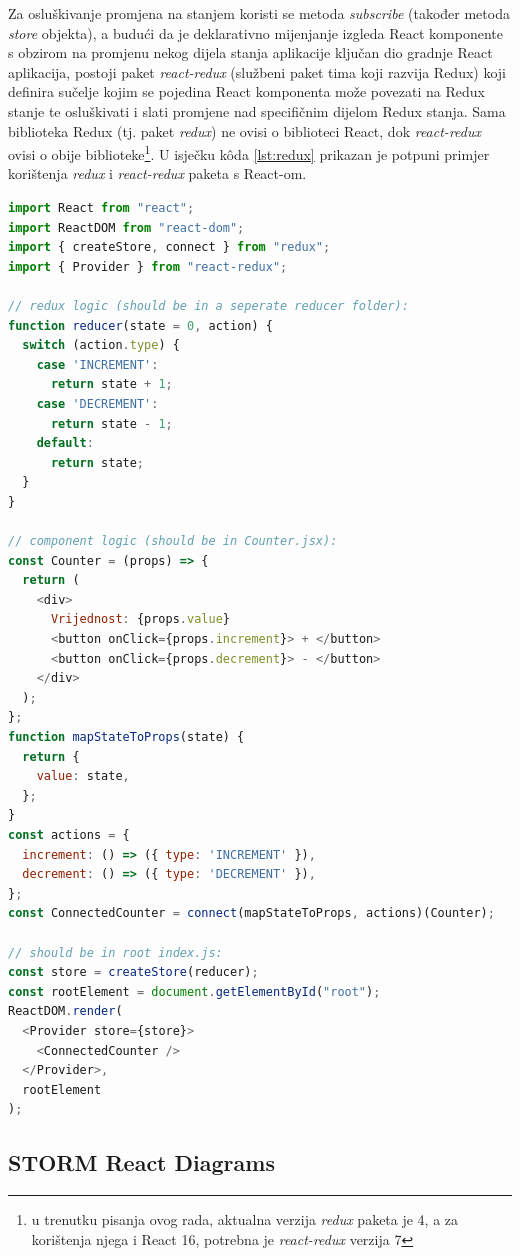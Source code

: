 \documentclass[times, utf8, diplomski, numeric]{fer}
\newcommand{\razmakp}{\vspace{18pt}}
\newcommand{\razmaks}{\vspace{10pt}}
\begin{document}
Za osluškivanje promjena na stanjem koristi se metoda \emph{subscribe} (također metoda \emph{store} objekta), a budući da je deklarativno mijenjanje izgleda React komponente s obzirom na promjenu nekog dijela stanja aplikacije ključan dio gradnje React aplikacija, postoji paket \emph{react-redux} (službeni paket tima koji razvija Redux) koji definira sučelje kojim se pojedina React komponenta može povezati  na Redux stanje te osluškivati i slati promjene nad specifičnim dijelom Redux stanja.
Sama biblioteka Redux (tj. paket \emph{redux}) ne ovisi o biblioteci React, dok \emph{react-redux} ovisi o obije biblioteke\footnote{
    u trenutku pisanja ovog rada, aktualna verzija \emph{redux} paketa je 4, a za korištenja njega i React 16, potrebna je \emph{react-redux} verzija 7
}.
U isječku kôda \ref{lst:redux} prikazan je potpuni primjer korištenja \emph{redux} i \emph{react-redux} paketa s React-om.

\razmakp %
\begin{lstlisting}[language=JavaScript, caption={Primjer korištenja Redux biblioteke u React aplikaciji}, label={lst:redux}]
import React from "react";
import ReactDOM from "react-dom";
import { createStore, connect } from "redux";
import { Provider } from "react-redux";

// redux logic (should be in a seperate reducer folder):
function reducer(state = 0, action) {
  switch (action.type) {
    case 'INCREMENT':
      return state + 1;
    case 'DECREMENT':
      return state - 1;
    default:
      return state;
  }
}

// component logic (should be in Counter.jsx):
const Counter = (props) => {
  return (
    <div>
      Vrijednost: {props.value}
      <button onClick={props.increment}> + </button>
      <button onClick={props.decrement}> - </button>
    </div>
  );
};
function mapStateToProps(state) {
  return {
    value: state,
  };
}
const actions = {
  increment: () => ({ type: 'INCREMENT' }),
  decrement: () => ({ type: 'DECREMENT' }),
};
const ConnectedCounter = connect(mapStateToProps, actions)(Counter);

// should be in root index.js:
const store = createStore(reducer);
const rootElement = document.getElementById("root");
ReactDOM.render(
  <Provider store={store}>
    <ConnectedCounter />
  </Provider>,
  rootElement
);
\end{lstlisting}
\razmaks


\newpage
\subsection{STORM React Diagrams} \label{sec:storm}
\end{document}
